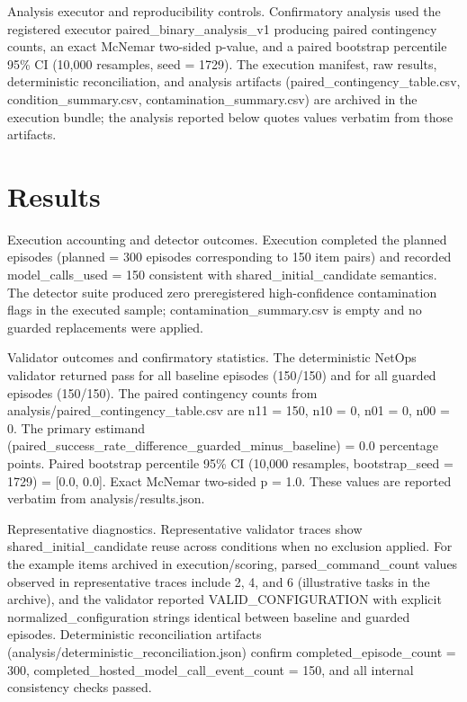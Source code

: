 \documentclass[conference]{IEEEtran}
\begin{document}
Analysis executor and reproducibility controls. Confirmatory analysis used the registered executor paired\_binary\_analysis\_v1 producing paired contingency counts, an exact McNemar two-sided p-value, and a paired bootstrap percentile 95\% CI (10,000 resamples, seed = 1729). The execution manifest, raw results, deterministic reconciliation, and analysis artifacts (paired\_contingency\_table.csv, condition\_summary.csv, contamination\_summary.csv) are archived in the execution bundle; the analysis reported below quotes values verbatim from those artifacts.

\section{Results}
Execution accounting and detector outcomes. Execution completed the planned episodes (planned = 300 episodes corresponding to 150 item pairs) and recorded model\_calls\_used = 150 consistent with shared\_initial\_candidate semantics. The detector suite produced zero preregistered high-confidence contamination flags in the executed sample; contamination\_summary.csv is empty and no guarded replacements were applied.

Validator outcomes and confirmatory statistics. The deterministic NetOps validator returned pass for all baseline episodes (150/150) and for all guarded episodes (150/150). The paired contingency counts from analysis/paired\_contingency\_table.csv are n11 = 150, n10 = 0, n01 = 0, n00 = 0. The primary estimand (paired\_success\_rate\_difference\_guarded\_minus\_baseline) = 0.0 percentage points. Paired bootstrap percentile 95\% CI (10,000 resamples, bootstrap\_seed = 1729) = [0.0, 0.0]. Exact McNemar two-sided p = 1.0. These values are reported verbatim from analysis/results.json.

Representative diagnostics. Representative validator traces show shared\_initial\_candidate reuse across conditions when no exclusion applied. For the example items archived in execution/scoring, parsed\_command\_count values observed in representative traces include 2, 4, and 6 (illustrative tasks in the archive), and the validator reported VALID\_CONFIGURATION with explicit normalized\_configuration strings identical between baseline and guarded episodes. Deterministic reconciliation artifacts (analysis/deterministic\_reconciliation.json) confirm completed\_episode\_count = 300, completed\_hosted\_model\_call\_event\_count = 150, and all internal consistency checks passed.
\end{document}
